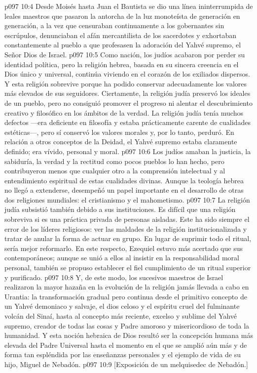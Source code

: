 \vs p097 10:4 Desde Moisés hasta Juan el Bautista se dio una línea ininterrumpida de leales maestros que pasaron la antorcha de la luz monoteísta de generación en generación, a la vez que censuraban continuamente a los gobernantes sin escrúpulos, denunciaban el afán mercantilista de los sacerdotes y exhortaban constantemente al pueblo a que profesasen la adoración del Yahvé supremo, el Señor Dios de Israel.
\vs p097 10:5 \pc Como nación, los judíos acabaron por perder su identidad política, pero la religión hebrea, basada en su sincera creencia en el Dios único y universal, continúa viviendo en el corazón de los exiliados dispersos. Y esta religión sobrevive porque ha podido conservar adecuadamente los valores más elevados de sus seguidores. Ciertamente, la religión judía preservó los ideales de un pueblo, pero no consiguió promover el progreso ni alentar el descubrimiento creativo y filosófico en los ámbitos de la verdad. La religión judía tenía muchos defectos ---era deficiente en filosofía y estaba prácticamente carente de cualidades estéticas---, pero sí conservó los valores morales y, por lo tanto, perduró. En relación a otros conceptos de la Deidad, el Yahvé supremo estaba claramente definido; era vívido, personal y moral.
\vs p097 10:6 Los judíos amaban la justicia, la sabiduría, la verdad y la rectitud como pocos pueblos lo han hecho, pero contribuyeron menos que cualquier otro a la comprensión intelectual y al entendimiento espiritual de estas cualidades divinas. Aunque la teología hebrea no llegó a extenderse, desempeñó un papel importante en el desarrollo de otras dos religiones mundiales: el cristianismo y el mahometismo.
\vs p097 10:7 La religión judía subsistió también debido a sus instituciones. Es difícil que una religión sobreviva si es una práctica privada de personas aisladas. Este ha sido siempre el error de los líderes religiosos: ver las maldades de la religión institucionalizada y tratar de anular la forma de actuar en grupo. En lugar de suprimir todo el ritual, sería mejor reformarlo. En este respecto, Ezequiel estuvo más acertado que sus contemporáneos; aunque se unió a ellos al insistir en la responsabilidad moral personal, también se propuso establecer el fiel cumplimiento de un ritual superior y purificado.
\vs p097 10:8 \pc Y, de este modo, los sucesivos maestros de Israel realizaron la mayor hazaña en la evolución de la religión jamás llevada a cabo en Urantia: la transformación gradual pero continua desde el primitivo concepto de un Yahvé demoniaco y salvaje, el dios celoso y el espíritu cruel del fulminante volcán del Sinaí, hasta al concepto más reciente, excelso y sublime del Yahvé supremo, creador de todas las cosas y Padre amoroso y misericordioso de toda la humanidad. Y esta noción hebraica de Dios resultó ser la concepción humana más elevada del Padre Universal hasta el momento en el que se amplió aún más y de forma tan espléndida por las enseñanzas personales y el ejemplo de vida de su hijo, Miguel de Nebadón.
\vsetoff
\vs p097 10:9 [Exposición de un melquisedec de Nebadón.]
